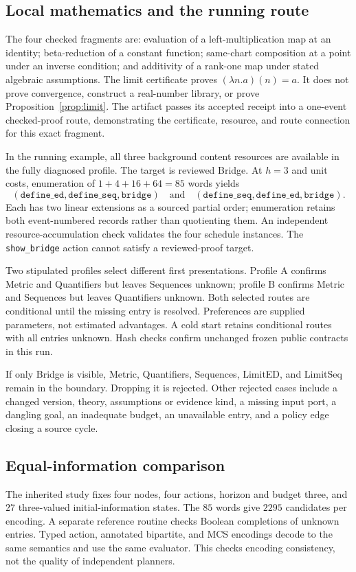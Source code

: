 \documentclass[11pt,a4paper]{article}
\theoremstyle{remark}
\begin{document}
\subsection{Local mathematics and the running route}
The four checked fragments are: evaluation of a left-multiplication map at an
identity; beta-reduction of a constant function; same-chart composition at a
point under an inverse condition; and additivity of a rank-one map under
stated algebraic assumptions. The limit certificate proves
\((\lambda n.a)(n)=a\). It does not prove convergence, construct a real-number
library, or prove Proposition~\ref{prop:limit}. The artifact passes its accepted
receipt into a one-event checked-proof route, demonstrating the certificate,
resource, and route connection for this exact fragment.

In the running example, all three background content resources are available
in the fully diagnosed profile. The target is reviewed Bridge. At \(h=3\)
and unit costs, enumeration of \(1+4+16+64=85\) words yields
\[
 (\texttt{define\_ed},\texttt{define\_seq},\texttt{bridge})
 \quad\text{and}\quad
 (\texttt{define\_seq},\texttt{define\_ed},\texttt{bridge}).
\]
Each has two linear extensions as a sourced partial order; enumeration
retains both event-numbered records rather than quotienting them.
An independent resource-accumulation check validates the four schedule
instances. The \texttt{show\_bridge} action cannot satisfy a reviewed-proof target.

Two stipulated profiles select different first presentations. Profile A
confirms Metric and Quantifiers but leaves Sequences unknown; profile B
confirms Metric and Sequences but leaves Quantifiers unknown.
Both selected routes are conditional until the missing entry is resolved.
Preferences are supplied parameters, not estimated advantages.
A cold start retains conditional routes with all entries unknown.
Hash checks confirm unchanged frozen public contracts in this run.

If only Bridge is visible, Metric, Quantifiers, Sequences, LimitED, and
LimitSeq remain in the boundary. Dropping it is rejected. Other rejected cases
include a changed version, theory, assumptions or evidence kind, a missing
input port, a dangling goal, an inadequate budget, an unavailable entry,
and a policy edge closing a source cycle.

\subsection{Equal-information comparison}
The inherited study fixes four nodes, four actions, horizon and budget three,
and \(27\) three-valued initial-information states. The \(85\) words give
\(2295\) candidates per encoding. A separate reference routine checks Boolean
completions of unknown entries. Typed action, annotated bipartite, and MCS
encodings decode to the same semantics and use the same evaluator.
This checks encoding consistency, not the quality of independent planners.
\end{document}
